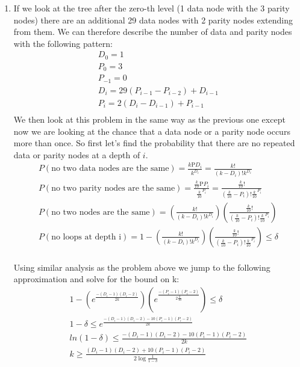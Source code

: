 \documentclass[11pt]{article}
\begin{document}
\begin{enumerate}
\begin{enumerate}
        \item
        	If we look at the tree after the zero-th level (1 data node with the 3 parity nodes) there are an additional 29 data nodes with 2 parity nodes extending from them. We can therefore describe the number of data and parity nodes with the following pattern: \\
	\begin{eqnarray*}
	D_0=1 \\ P_0=3 \\ P_{-1}=0 \\
	D_i=29(P_{i-1}-P_{i-2})+D_{i-1} \\
	P_i=2(D_i-D_{i-1})+P_{i-1} \\
	\end{eqnarray*}
	We then look at this problem in the same way as the previous one except now we are looking at the chance that a data node or a parity node occurs more than once. So first let's find the probability that there are no repeated data or parity nodes at a depth of $i$. \\
	\begin{eqnarray*}
	   P(\mbox{no two data nodes are the same}) = \frac{k\mbox{P}D_i}{k^{D_i}} = \frac{k!}{(k-D_i)!k^{D_i}}\\
	   P(\mbox{no two parity nodes are the same}) = \frac{\frac{k}{10}\mbox{P}P_i}{\frac{k}{10}^{P_i}} = \frac{\frac{k}{10}!}{(\frac{k}{10}-P_i)!\frac{k}{10}^{P_i}}\\
	   P(\mbox{no two nodes are the same}) = \left(\frac{k!}{(k-D_i)!k^{D_i}}\right)\left(\frac{\frac{k}{10}!}{(\frac{k}{10}-P_i)!\frac{k}{10}^{P_i}}\right) \\
	   P(\mbox{no loops at depth i}) = 1- \left(\frac{k!}{(k-D_i)!k^{D_i}}\right)\left(\frac{\frac{k}{10}!}{(\frac{k}{10}-P_i)!\frac{k}{10}^{P_i}}\right) \leq \delta \\
	\end{eqnarray*}
	
	Using similar analysis as the problem above we jump to the following approximation and solve for the bound on k: \\
	\begin{eqnarray*}
	   1-\left(e^{\frac{-(D_i-1)(D_i-2)}{2k}}\right)\left(e^{\frac{-(P_i-1)(P_i-2)}{2\frac{k}{10}}}\right) \leq \delta \\
	   1- \delta \leq e^{\frac{-(D_i-1)(D_i-2)-10(P_i-1)(P_i-2)}{2k}} \\
	   ln(1-\delta) \leq \frac{-(D_i-1)(D_i-2)-10(P_i-1)(P_i-2)}{2k} \\
	   k \geq \frac{(D_i-1)(D_i-2)+10(P_i-1)(P_i-2)}{2 \log{\frac{1}{1-\delta}}} \\
	\end{eqnarray*}
	


\end{enumerate}
\end{enumerate}
\end{document}
